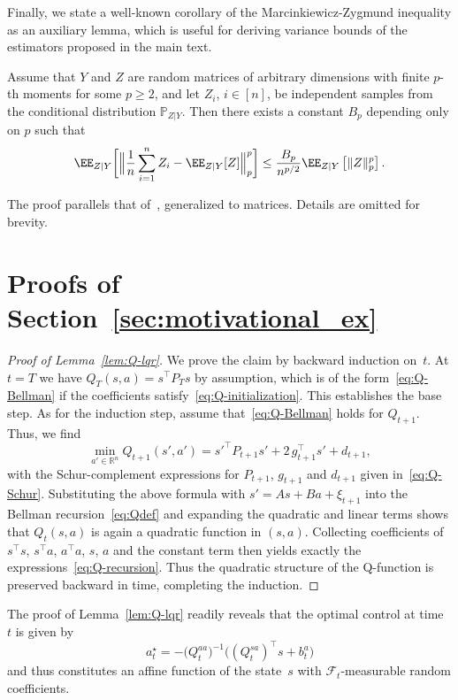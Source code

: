 \documentclass[11pt]{article}
\begin{document}
Finally, we state a well-known corollary of the Marcinkiewicz-Zygmund inequality as an auxiliary lemma, which is useful for deriving variance bounds of the estimators proposed in the main text.


\begin{lemma}
\label{lemma:moment-inequality-multidimensional} Assume that $Y$ and $Z$ are random matrices of arbitrary dimensions with finite $p$-th moments for some $p\geq 2$, and let $Z_i$, $i\in[n]$, be independent samples from the conditional distribution $\mathbb P_{Z|Y}$. Then there exists a constant $B_p$ depending only on $p$ such that
    \begin{equation*}
        \EE_{Z|Y}\bigg[\Big\|\frac{1}{n}\sum_{i=1}^n Z_i-\EE_{Z|Y}[Z]\Big\|^p_p\bigg] \leq \frac{B_p}{n^{p/2}}  \EE_{Z|Y}\left[ \|Z\|^{p}_p \right].
    \end{equation*}
\end{lemma}
The proof parallels that of~\cite[Corollary 2]{zhou2022unbiased}, generalized to matrices. Details are omitted for brevity. 

\section{Proofs of Section~\ref{sec:motivational_ex}}
\label{sec:proofs-section-2}
\begin{proof}[Proof of Lemma~\ref{lem:Q-lqr}]
We prove the claim by backward induction on~$t$. At $t=T$ we have $Q_T(s,a)=s^\top P_T s$ by assumption, which is of the form~\eqref{eq:Q-Bellman} if the coefficients satisfy~\eqref{eq:Q-initialization}. This establishes the base step. As for the induction step, assume that~\eqref{eq:Q-Bellman} holds for $Q_{t+1}$. Thus, we find 
\[
	\min_{a'\in\mathbb R^n} Q_{t+1}(s',a')  = {s'}^\top P_{t+1} s' + 2\,g_{t+1}^\top s' + d_{t+1},
\]
with the Schur-complement expressions for $P_{t+1}$, $g_{t+1}$ and $d_{t+1}$ given in~\eqref{eq:Q-Schur}. Substituting the above formula with $s'=A s + B a + \xi_{t+1}$ into the Bellman recursion~\eqref{eq:Qdef} and expanding the quadratic and linear terms shows that $Q_t(s,a)$ is again a quadratic function in $(s,a)$. Collecting coefficients of $s^\top s$, $s^\top a$, $a^\top a$, $s$, $a$ and the constant term then yields exactly the expressions~\eqref{eq:Q-recursion}. Thus the quadratic structure of the Q-function is preserved backward in time, completing the induction. 
\end{proof}

The proof of Lemma~\ref{lem:Q-lqr} readily reveals that the optimal control at time~$t$ is given by
\begin{equation*}
a_t^\star = -\big(Q_t^{aa}\big)^{-1} \big((Q_t^{sa})^\top s + b_t^a \big)
\end{equation*}
and thus constitutes an affine function of the state~$s$ with $\mathcal F_t$-measurable random coefficients.
\end{document}
